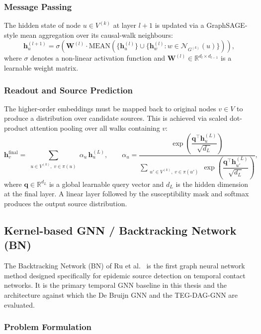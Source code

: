 \subsubsection{Message Passing}
\label{sssec:dbgnn-mp}

The hidden state of node $u \in V^{(k)}$ at layer $l+1$ is updated via a GraphSAGE-style mean aggregation over its causal-walk neighbours:
\[
    \mathbf{h}_u^{(l+1)} = \sigma\!\left(\mathbf{W}^{(l)} \cdot \mathrm{MEAN}\!\left(\{\mathbf{h}_u^{(l)}\} \cup \{\mathbf{h}_w^{(l)} : w \in \mathcal{N}_{G^{(k)}}(u)\}\right)\right),
\]
where $\sigma$ denotes a non-linear activation function and $\mathbf{W}^{(l)} \in \mathbb{R}^{d_l \times d_{l-1}}$ is a learnable weight matrix.

\subsubsection{Readout and Source Prediction}
\label{sssec:dbgnn-readout}

The higher-order embeddings must be mapped back to original nodes $v \in V$ to produce a distribution over candidate sources. This is achieved via scaled dot-product attention pooling over all walks containing $v$:
\[
    \mathbf{h}_v^{\mathrm{final}} = \sum_{\substack{u \in V^{(k)},\; v \in \pi(u)}} \alpha_u\, \mathbf{h}_u^{(L)}, \qquad \alpha_u = \frac{\exp\!\left(\dfrac{\mathbf{q}^\top \mathbf{h}_u^{(L)}}{\sqrt{d_L}}\right)}{\displaystyle\sum_{\substack{u' \in V^{(k)},\; v \in \pi(u')}} \exp\!\left(\dfrac{\mathbf{q}^\top \mathbf{h}_{u'}^{(L)}}{\sqrt{d_L}}\right)},
\]
where $\mathbf{q} \in \mathbb{R}^{d_L}$ is a global learnable query vector and $d_L$ is the hidden dimension at the final layer. A linear layer followed by the susceptibility mask and softmax produces the output source distribution.
\subsection{Kernel-based GNN / Backtracking Network (BN)}
\label{ssst:kernelmodel}

The Backtracking Network (BN) of Ru et al.~\cite{Ru2023} is the first graph neural network method designed specifically for epidemic source detection on temporal contact networks. It is the primary temporal GNN baseline in this thesis and the architecture against which the De Bruijn GNN and the TEG-DAG-GNN are evaluated.

\subsubsection{Problem Formulation}
\label{sssec:bn-problem}

